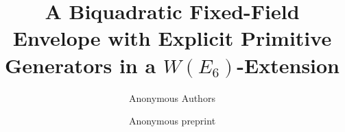 \documentclass[11pt,reqno]{amsart}
\title[Biquadratic fixed-field envelope]{A Biquadratic Fixed-Field Envelope with Explicit Primitive Generators in a $W(E_6)$-Extension}
\author{Anonymous Authors}
\date{Anonymous preprint}
\theoremstyle{definition}
\theoremstyle{remark}
\numberwithin{equation}{section}
\begin{document}
\raggedbottom

\begin{abstract}

\end{abstract}

\maketitle














\appendix




\end{document}
